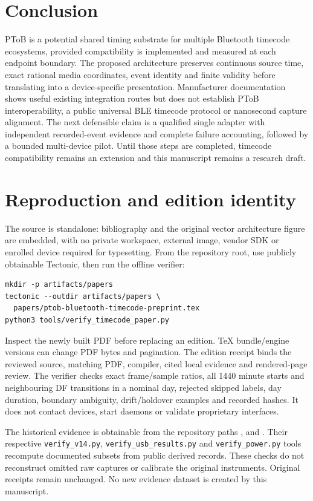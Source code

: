 \documentclass[11pt,letterpaper]{article}
\newcommand{\code}[1]{\texttt{#1}}
\begin{document}
\section{Conclusion}
PToB is a potential shared timing substrate for multiple Bluetooth timecode ecosystems, provided compatibility is implemented and measured at each endpoint boundary. The proposed architecture preserves continuous source time, exact rational media coordinates, event identity and finite validity before translating into a device-specific presentation. Manufacturer documentation shows useful existing integration routes but does not establish PToB interoperability, a public universal BLE timecode protocol or nanosecond capture alignment. The next defensible claim is a qualified single adapter with independent recorded-event evidence and complete failure accounting, followed by a bounded multi-device pilot. Until those steps are completed, timecode compatibility remains an extension and this manuscript remains a research draft.

\appendix
\section{Reproduction and edition identity}\label{app:reproduce}
The source is standalone: bibliography and the original vector architecture figure are embedded, with no private workspace, external image, vendor SDK or enrolled device required for typesetting. From the repository root, use publicly obtainable Tectonic, then run the offline verifier:
\begin{verbatim}
mkdir -p artifacts/papers
tectonic --outdir artifacts/papers \
  papers/ptob-bluetooth-timecode-preprint.tex
python3 tools/verify_timecode_paper.py
\end{verbatim}
Inspect the newly built PDF before replacing an edition. TeX bundle/engine versions can change PDF bytes and pagination. The edition receipt  binds the reviewed source, matching PDF, compiler, cited local evidence and rendered-page review. The verifier checks exact frame/sample ratios, all 1440 minute starts and neighbouring DF transitions in a nominal day, rejected skipped labels, day duration, boundary ambiguity, drift/holdover examples and recorded hashes. It does not contact devices, start daemons or validate proprietary interfaces.

The historical evidence is obtainable from the repository paths ,  and . Their respective \code{verify\_v14.py}, \code{verify\_usb\_results.py} and \code{verify\_power.py} tools recompute documented subsets from public derived records. These checks do not reconstruct omitted raw captures or calibrate the original instruments. Original receipts remain unchanged. No new evidence dataset is created by this manuscript.
\end{document}
